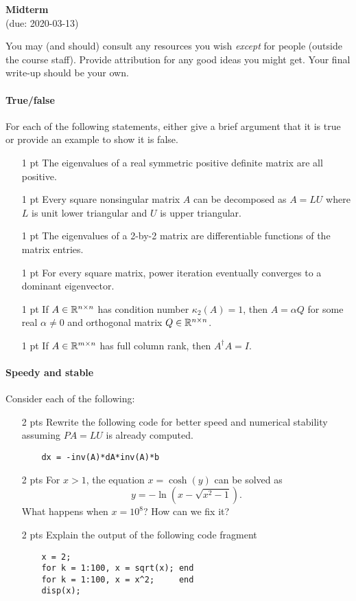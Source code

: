 \documentclass[12pt, leqno]{article} %
\begin{document}
\pagestyle{fancy}
\fancyfoot{}
\begin{center}
  {\large{\bf Midterm}} \\ (due: 2020-03-13)
\end{center}
\lstset{language=Julia,columns=flexible}

You may (and should) consult any resources you wish {\em except} for
people (outside the course staff).  Provide attribution for any good
ideas you might get.  Your final write-up should be your own.


\paragraph*{True/false}
For each of the following statements, either give a brief argument
that it is true or provide an example to show it is false.
\begin{itemize}
\item[1 pt]
  The eigenvalues of a real symmetric positive definite matrix are
  all positive.
\item[1 pt]
  Every square nonsingular matrix $A$ can be decomposed as $A =
  LU$ where $L$ is unit lower triangular and $U$ is upper triangular.
\item[1 pt]
  The eigenvalues of a 2-by-2 matrix are differentiable functions
  of the matrix entries.
\item[1 pt]
  For every square matrix, power iteration eventually converges to
  a dominant eigenvector.
\item[1 pt]
  If $A \in \mathbb{R}^{n \times n}$ has condition number $\kappa_2(A) = 1$,
  then $A = \alpha Q$ for some real $\alpha \neq 0$
  and orthogonal matrix $Q \in \mathbb{R}^{n \times n}$.
\item[1 pt]
  If $A \in \mathbb{R}^{m \times n}$ has full column rank, then $A^\dagger A = I$.
\end{itemize}
  
\paragraph*{Speedy and stable}
Consider each of the following:
\begin{itemize}
\item[2 pts]
  Rewrite the following code for better speed and numerical stability
  assuming $PA = LU$ is already computed.
  \begin{lstlisting}
    dx = -inv(A)*dA*inv(A)*b
  \end{lstlisting}
\item[2 pts]
  For $x > 1$, the equation $x = \cosh(y)$ can be solved as
  \[
    y = -\ln\left(x - \sqrt{x^2-1}\right).
  \]
  What happens when $x = 10^8$?  How can we fix it?
\item[2 pts]
  Explain the output of the following code fragment
  \begin{lstlisting}
    x = 2;
    for k = 1:100, x = sqrt(x); end
    for k = 1:100, x = x^2;     end
    disp(x);
  \end{lstlisting}
\end{itemize}
\end{document}
